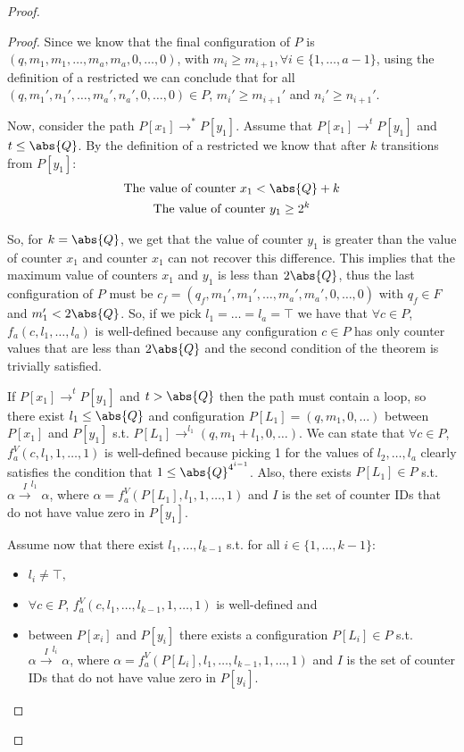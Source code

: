 \begin{proof}
\begin{proof}

Since we know that the final configuration of $P$ is $(q,m_1,m_1,\dots,m_a,m_a,0,\dots,0)$, with $m_i\geq m_{i+1},\forall i\in\{1,\dots,a-1\}$, using the definition of a restricted \laVASS we can conclude that for all $(q,m_1',n_1',\dots,m_a',n_a',0,\dots,0)\in P$, $m_i'\geq m_{i+1}'$ and $n_i'\geq n_{i+1}'$.

Now, consider the path $P[x_1]\xrightarrow{}^* P[y_1]$. Assume that $P[x_1]\xrightarrow{}^t P[y_1]$ and $t\leq\abs{Q}$. By the definition of a restricted \laVASS we know that after $k$ transitions from $P[y_1]$:
\begin{gather*}
    \text{The value of counter } x_1<\abs{Q}+k\\
    \text{The value of counter } y_1\geq 2^k
\end{gather*}

So, for $k=\abs{Q}$, we get that the value of counter $y_1$ is greater than the value of counter $x_1$ and counter $x_1$ can not recover this difference. This implies that the maximum value of counters $x_1$ and $y_1$ is less than $2\abs{Q}$, thus the last configuration of $P$ must be $c_f=(q_f,m_1',m_1',\dots,m_a',m_a',0,\dots,0)$ with $q_f\in F$ and $m_1'<2\abs{Q}$. So, if we pick $l_1=\dots=l_a=\top$ we have that $\forall c\in P$, $f_a(c,l_1,\dots,l_a)$ is well-defined because any configuration $c\in P$ has only counter values that are less than $2\abs{Q}$ and the second condition of the theorem is trivially satisfied. 

If $P[x_1]\xrightarrow{}^t P[y_1]$ and $t>\abs{Q}$ then the path must contain a loop, so there exist $l_1\leq\abs{Q}$ and configuration $P[L_1]=(q,m_1,0,\dots)$ between $P[x_1]$ and $P[y_1]$ s.t. $P[L_1]\xrightarrow{}^{l_1}(q,m_1+l_1,0,\dots)$. We can state that $\forall c\in P$, $f_a^V(c,l_1,1,\dots,1)$ is well-defined because picking 1 for the values of $l_2,\dots,l_a$ clearly satisfies the condition that $1\leq\abs{Q}^{4^{i-1}}$. Also, there exists $P[L_1]\in P$ s.t. $\alpha\xrightarrow{I}^{l_1}\alpha$, where $\alpha=f_a^V(P[L_1],l_1,1,\dots,1)$ and $I$ is the set of counter IDs that do not have value zero in $P[y_1]$.

Assume now that there exist $l_1,\dots,l_{k-1}$ s.t. for all $i\in\{1,\dots,k-1\}$:
\begin{itemize}
    \item $l_i\neq\top,$
    \item $\forall c\in P$, $f_a^V(c,l_1,\dots,l_{k-1},1,\dots,1)$ is well-defined and
    \item between $P[x_i]$ and $P[y_i]$ there exists a configuration $P[L_i]\in P$ s.t. $\alpha\xrightarrow{I}^{l_i}\alpha$, where $\alpha=f_a^V(P[L_i],l_1,\dots,l_{k-1},1,\dots,1)$ and $I$ is the set of counter IDs that do not have value zero in $P[y_i]$.
\end{itemize}


\end{proof}
\end{proof}
